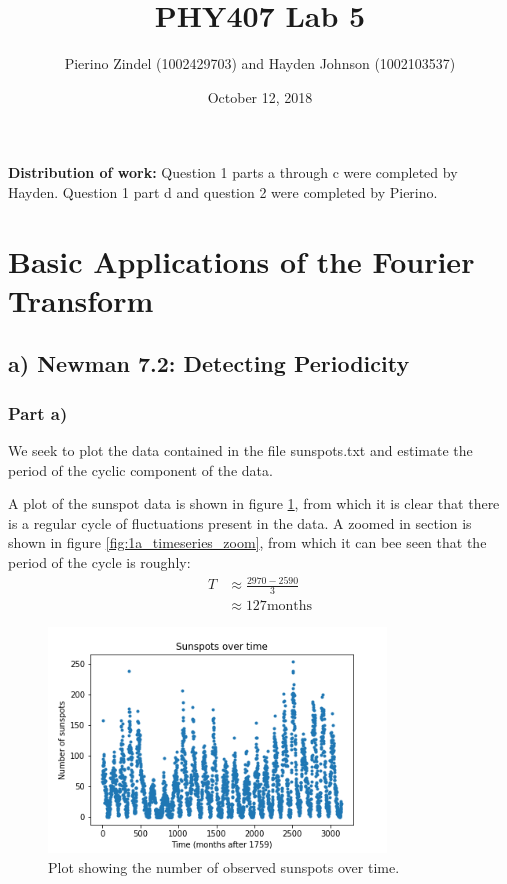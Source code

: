 \documentclass{article}
\title{PHY407 Lab 5}
\author{Pierino Zindel (1002429703) and Hayden Johnson (1002103537)}
\date{October 12, 2018}
\begin{document}
\maketitle

\noindent \textbf{Distribution of work:} Question 1 parts a through c were completed by Hayden. Question 1 part d and question 2 were completed by Pierino.

\section{Basic Applications of the Fourier Transform}

\subsection{a) Newman 7.2: Detecting Periodicity}

\subsubsection{Part a)}

We seek to plot the data contained in the file sunspots.txt and estimate the period of the cyclic component of the data.

A plot of the sunspot data is shown in figure \ref{fig:1a_timeseries}, from which it is clear that there is a regular cycle of fluctuations present in the data. A zoomed in section is shown in figure \ref{fig:1a_timeseries_zoom}, from which it can bee seen that the period of the cycle is roughly:
\begin{align*}
	T &\approx \frac{2970 - 2590}{3} \\
	&\approx 127 \text{months}
\end{align*}

\begin{figure}[H]
	\centering
	\includegraphics[width=0.8\textwidth]{../images/1a_timeseries.png}
	\caption{Plot showing the number of observed sunspots over time.}
	\label{fig:1a_timeseries}
\end{figure}
\end{document}
